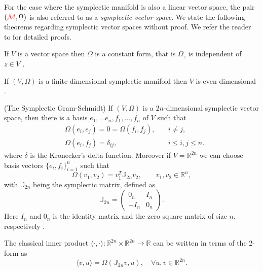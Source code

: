 For the case where the symplectic manifold is also a linear vector space, the pair $({\color{red} \mathcal M},\Omega)$ is also referred to as a \emph{symplectic vector space}. We state the following theorems regarding symplectic vector spaces without proof. We refer the reader to \cite{de2006symplectic,Marsden:1999ck,de2006symplectic,Silva01lectureson} for detailed proofs.

{\edit
\begin{theorem} \label{theorem:Hasy:1.1}
If $V$ is a vector space then $\Omega$ is a constant form, that is $\Omega_z$ is independent of $z\in V$ \cite{Marsden:1999ck}. 
\end{theorem}
\begin{theorem} \label{theorem:Hasy:1.2}
If $(V,\Omega)$ is a finite-dimensional symplectic manifold then $V$ is even dimensional \cite{Marsden:1999ck}.
\end{theorem}
\begin{theorem} \label{theorem:Hasy:1.3}
(The Symplectic Gram-Schmidt) If $(V,\Omega)$ is a $2n$-dimensional symplectic vector space, then there is a basis $e_1,\dots e_n,f_1, \dots , f_n$ of $V$ such that
\begin{equation} \label{eq:Hasy:4}
\begin{aligned}
	& \Omega(e_i,e_j) = 0 = \Omega(f_i,f_j), \quad & i\neq j,\\
	& \Omega(e_i,f_j) = \delta_{ij}, & i\leq i,j \leq n.
\end{aligned}
\end{equation}
where $\delta$ is the Kronecker's delta function. Moreover if $V = \mathbb{R}^{2n}$ we can choose basis vectors $\{e_i,f_i\}_{i=1}^n$ such that
\begin{equation} \label{eq:Hasy:5}
	\Omega(v_1,v_2) = v_1^T \mathbb J_{2n} v_2, \qquad v_1,v_2\in \mathbb R^n,
\end{equation}
with $\mathbb J_{2n}$ being the symplectic matrix, defined as
\begin{equation} \label{eq:Hasy:6}
	\mathbb{J}_{2n} = 
	\begin{pmatrix}
		0_n & I_n \\
		-I_n & 0_n
	\end{pmatrix}.
\end{equation}
Here $I_n$ and $0_n$ is the identity matrix and the zero square matrix of size $n$, respectively \cite{de2006symplectic}.
\end{theorem}
\begin{theorem} \label{theorem:Hasy:1.4}
The classical inner product $\langle \cdot,\cdot \rangle:\mathbb R^{2n}\times \mathbb R^{2n}\to \mathbb R$ can be written in terms of the 2-form as \cite{Marsden:1999ck}
\begin{equation}
	\langle v,u \rangle = \Omega(\mathbb J_{2n}v,u),\quad \forall u,v \in \mathbb R^{2n}.
\end{equation}
\end{theorem}
}

